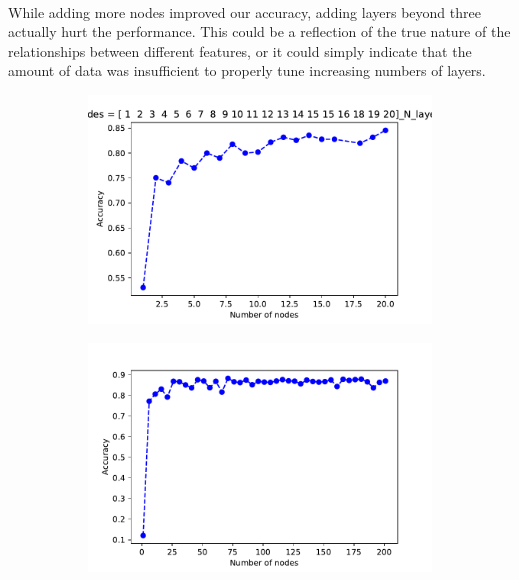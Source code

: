 \documentclass[11pt]{article}
\begin{document}
\paragraph{}While adding more nodes improved our accuracy, adding layers beyond three actually hurt the performance. This could be a reflection of the true nature of the relationships between different features, or it could simply indicate that the amount of data was insufficient to properly tune increasing numbers of layers.
\begin{figure}[] 
\centering
    \begin{subfigure}[!t]{0.3\textwidth}
        \includegraphics[width=\textwidth]{Plots/Alan_features_N_nodes_1_20_N_layers3.pdf}
    \end{subfigure}
        \begin{subfigure}[!t]{0.3\textwidth}
        \includegraphics[width=\textwidth]{Plots/Alan_features_N_nodes_6-201_N_layers3.pdf}

\end{subfigure}
\end{figure}
\end{document}
